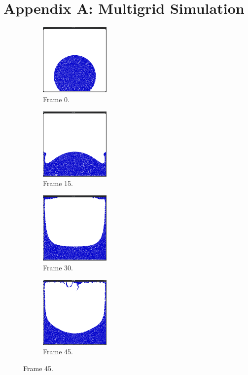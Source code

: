 \section*{Appendix A: Multigrid Simulation}
\begin{figure}[ht!]
\centering
\begin{subfigure}[]{0.3\textwidth}
\includegraphics[height=35mm]{png/multigrid0.png}
\caption{Frame 0.}
\end{subfigure}
\begin{subfigure}[]{0.3\textwidth}
\includegraphics[height=35mm]{png/multigrid1.png}
\caption{Frame 15.}
\end{subfigure}
\begin{subfigure}[]{0.3\textwidth}
\includegraphics[height=35mm]{png/multigrid2.png}
\caption{Frame 30.}
\end{subfigure}
\begin{subfigure}[]{0.3\textwidth}
\includegraphics[height=35mm]{png/multigrid3.png}
\caption{Frame 45.}

\end{subfigure}
\end{figure}
